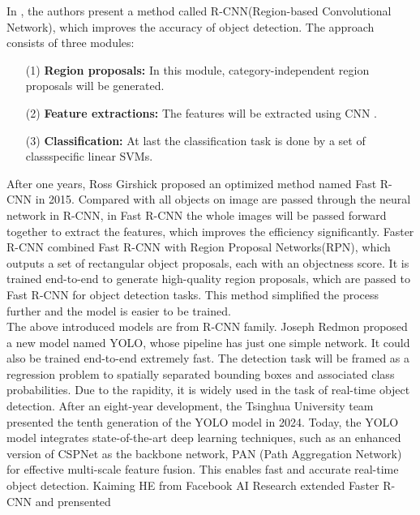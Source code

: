     In \cite{Girshick_2014_CVPR}, the authors present a method called R-CNN(Region-based Convolutional Network), which improves the accuracy of object detection. 
    The approach consists of three modules:
    \begin{itemize}
        \item [(1)] \textbf{Region proposals: }In this module, category-independent region proposals will be generated.
        \item [(2)] \textbf{Feature extractions: }The features will be extracted using CNN \cite{NIPS2012_c399862d}.
        \item [(3)] \textbf{Classification: }At last the classification task is done by a set of classspecific linear SVMs. 
    \end{itemize}
    After one years, Ross Girshick proposed an optimized method named Fast R-CNN in 2015\cite{Girshick_2015_ICCV}. Compared with all objects on image are passed 
    through the neural network in R-CNN,  in Fast R-CNN the whole images will be passed forward together to extract the features, which improves the efficiency 
    significantly. Faster R-CNN combined Fast R-CNN with Region Proposal Networks(RPN), which outputs a set of rectangular object proposals, each with an objectness
    score\cite{NIPS2015_14bfa6bb}. It is trained end-to-end to generate high-quality region proposals, which are passed to Fast R-CNN for object detection tasks.
    This method simplified the process further and the model is easier to be trained.\\
    The above introduced models are from R-CNN family. Joseph Redmon proposed a new model named YOLO, whose pipeline has just one simple network. It could also be 
    trained end-to-end extremely fast\cite{Redmon_2016_CVPR}. The detection task will be framed as a regression problem to spatially separated bounding boxes and
    associated class probabilities. Due to the rapidity, it is widely used in the task of real-time object detection. After an eight-year development, the Tsinghua 
    University team presented the tenth generation of the YOLO model in 2024\cite{wang2024yolov10}. Today, the YOLO model integrates state-of-the-art deep learning 
    techniques, such as an enhanced version of CSPNet\cite{Wang2019CSPNetAN} as the backbone network, PAN (Path Aggregation Network) for effective multi-scale feature
    fusion\cite{Liu_2018_CVPR}. This enables fast and accurate real-time object detection.
    Kaiming HE from Facebook AI Research extended Faster R-CNN\cite{NIPS2015_14bfa6bb} and prensented 
